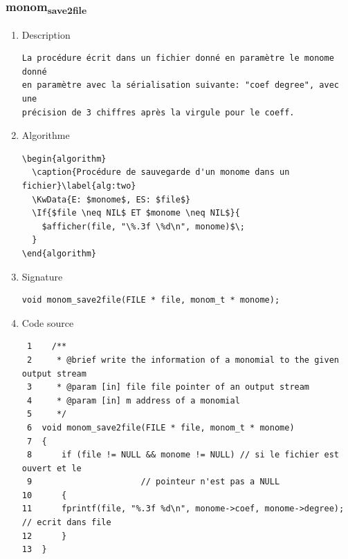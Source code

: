 \documentclass[11pt]{article}
\begin{document}
\subsubsection{monom\textsubscript{save2file}}
\label{sec:org877a1e5}
\begin{enumerate}
\item Description
\label{sec:org338b886}

\begin{verbatim}
La procédure écrit dans un fichier donné en paramètre le monome donné
en paramètre avec la sérialisation suivante: "coef degree", avec une
précision de 3 chiffres après la virgule pour le coeff.
\end{verbatim}

\item Algorithme
\label{sec:orgdbf85c0}

\begin{verbatim}
\begin{algorithm}
  \caption{Procédure de sauvegarde d'un monome dans un fichier}\label{alg:two}
  \KwData{E: $monome$, ES: $file$}
  \If{$file \neq NIL$ ET $monome \neq NIL$}{
    $afficher(file, "\%.3f \%d\n", monome)$\;
  }
\end{algorithm}
\end{verbatim}

\item Signature
\label{sec:orgb29acc8}

\begin{verbatim}
void monom_save2file(FILE * file, monom_t * monome);
\end{verbatim}

\item Code source
\label{sec:org6f98522}

\begin{verbatim}
 1    /**
 2     * @brief write the information of a monomial to the given output stream
 3     * @param [in] file file pointer of an output stream
 4     * @param [in] m address of a monomial
 5     */
 6  void monom_save2file(FILE * file, monom_t * monome)
 7  {
 8      if (file != NULL && monome != NULL) // si le fichier est ouvert et le
 9  					// pointeur n'est pas a NULL
10      {
11  	fprintf(file, "%.3f %d\n", monome->coef, monome->degree);  // ecrit dans file 
12      }
13  }
\end{verbatim}


\end{enumerate}
\end{document}

